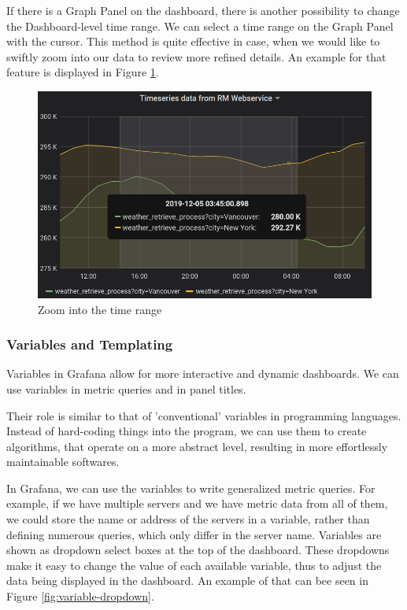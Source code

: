 If there is a Graph Panel on the dashboard, there is another possibility to change the Dashboard-level time range. We can select a time range on the Graph Panel with the cursor. This method is quite effective in case, when we would like to swiftly zoom into our data to review more refined details. An example for that feature is displayed in Figure \ref{fig:select-time}.

\begin{figure}[h]
	\centering
	\includegraphics[width=130mm, keepaspectratio]{figures/select-time.png}
	\caption{Zoom into the time range}
	\label{fig:select-time}
\end{figure}

\subsubsection{Variables and Templating}

Variables in Grafana allow for more interactive and dynamic dashboards. We can use variables in metric queries and in panel titles.

Their role is similar to that of 'conventional' variables in programming languages. Instead of hard-coding things into the program, we can use them to create algorithms, that operate on a more abstract level, resulting in more effortlessly maintainable softwares.

In Grafana, we can use the variables to write generalized metric queries. For example, if we have multiple servers and we have metric data from all of them, we could store the name or address of the servers in a variable, rather than defining numerous queries, which only differ in the server name. Variables are shown as dropdown select boxes at the top of the dashboard. These dropdowns make it easy to change the value of each available variable, thus to adjust the data being displayed in the dashboard.\cite{grafana-variables} An example of that can bee seen in Figure \ref{fig:variable-dropdown}.

